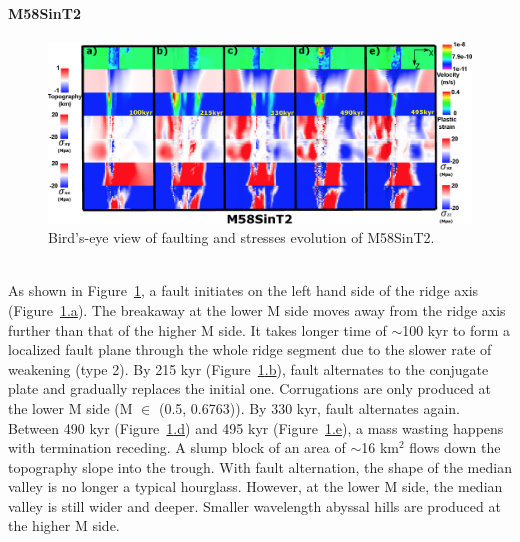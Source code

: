 \paragraph{M58SinT2}\label{para_M58SinT2}

\begin{figure}[h]
 \centering
  \includegraphics[width=1.0\textwidth]{./Figures/fig_Results_Weakening_6_M58SinT2_time_evolution.eps}
 \caption{Bird's-eye view of faulting and stresses evolution of M58SinT2.}
\label{fig_Results_Weakenging_6}
\end{figure}

~\\
As shown in Figure~\hyperref[fig_Results_Weakenging_6]{\ref{fig_Results_Weakenging_6}}, a fault initiates on the left hand side of the ridge axis (Figure~\hyperref[fig_Results_Weakenging_6]{\ref{fig_Results_Weakenging_6}.a}). The breakaway at the lower M side moves away from the ridge axis further than that of the higher M side. It takes longer time of $\sim$100 kyr to form a localized fault plane through the whole ridge segment due to the slower rate of weakening (type 2). By 215 kyr (Figure~\hyperref[fig_Results_Weakenging_6]{\ref{fig_Results_Weakenging_6}.b}), fault alternates to the conjugate plate and gradually replaces the initial one. Corrugations are only produced at the lower M side (M $\in$ (0.5, 0.6763)). By 330 kyr, fault alternates again. Between 490 kyr (Figure~\hyperref[fig_Results_Weakenging_6]{\ref{fig_Results_Weakenging_6}.d}) and 495 kyr (Figure~\hyperref[fig_Results_Weakenging_6]{\ref{fig_Results_Weakenging_6}.e}), a mass wasting happens with termination receding. A slump block of an area of $\sim$16 km$^{2}$ flows down the topography slope into the trough. With fault alternation, the shape of the median valley is no longer a typical hourglass. However, at the lower M side, the median valley is still wider and deeper. Smaller wavelength abyssal hills are produced at the higher M side. %

